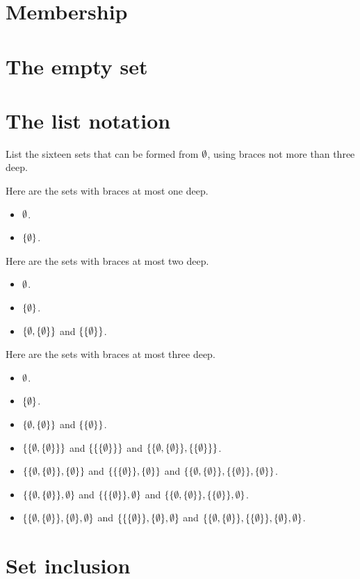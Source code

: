\section{Membership}
\section{The empty set}
\section{The list notation}

\begin{exercise}
List the sixteen sets that can be formed from $\emptyset$, using braces not more than three deep.
\end{exercise}

\begin{solution}
Here are the sets with braces at most one deep.
\begin{itemize}
    \item $\emptyset$.
    \item $\left\{\emptyset\right\}$.
\end{itemize}

Here are the sets with braces at most two deep.
\begin{itemize}
    \item $\emptyset$.
    \item $\left\{\emptyset\right\}$.
    \item $\left\{\emptyset, \left\{\emptyset\right\}\right\}$ and $\left\{\left\{\emptyset\right\}\right\}$.
\end{itemize}

Here are the sets with braces at most three deep.
\begin{itemize}
    \item $\emptyset$.
    \item $\left\{\emptyset\right\}$.
    \item $\left\{\emptyset, \left\{\emptyset\right\}\right\}$ and $\left\{\left\{\emptyset\right\}\right\}$.
    \item $\left\{\left\{\emptyset, \left\{\emptyset\right\}\right\}\right\}$ and $\left\{\left\{\left\{\emptyset\right\}\right\}\right\}$ and
    $\set{\set{\eset, \set{\eset}}, \set{\set{\eset}}}$.
    \item $\set{\set{\eset, \set{\eset}}, \set{\eset}}$ and $\set{\set{\set{\eset}}, \set{\eset}}$ and
    $\set{\set{\eset, \set{\eset}}, \set{\set{\eset}}, \set{\eset}}$.
    \item $\set{\set{\eset, \set{\eset}}, \eset}$ and $\set{\set{\set{\eset}}, \eset}$ and
    $\set{\set{\eset, \set{\eset}}, \set{\set{\eset}}, \eset}$.
    \item $\set{\set{\eset, \set{\eset}}, \set{\eset}, \eset}$ and $\set{\set{\set{\eset}}, \set{\eset}, \eset}$ and
    $\set{\set{\eset, \set{\eset}}, \set{\set{\eset}}, \set{\eset}, \eset}$.
\end{itemize}

\end{solution}
\section{Set inclusion}

